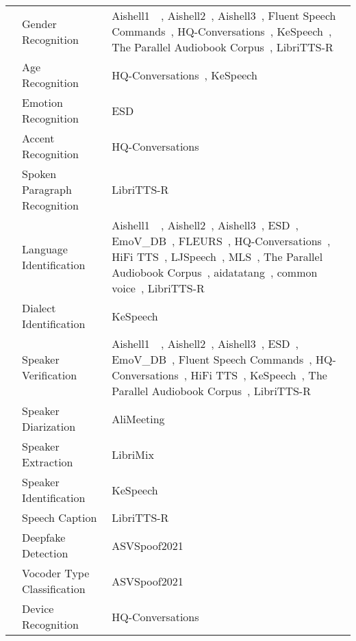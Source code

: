 \begin{longtable}{p{1cm}p{6cm}p{6cm}}
    & Gender Recognition & Aishell1~\citep{bu2017aishell}~\citep{bu2017aishell}, Aishell2~\citep{du2018aishell}, Aishell3~\citep{shi2020aishell}, Fluent Speech Commands~\citep{lugosch2019speech}, HQ-Conversations~\citep{xia2024iscslp}, KeSpeech~\citep{tang2021kespeech}, The Parallel Audiobook Corpus~\citep{pacorpus18}, LibriTTS-R~\citep{koizumi2023librittsr} \\
    \cline{2-3} %
    & Age Recognition & HQ-Conversations~\citep{xia2024iscslp}, KeSpeech~\citep{tang2021kespeech} \\
    \cline{2-3} %
    & Emotion Recognition & ESD~\citep{zhou2022emotional} \\
    \cline{2-3} %
    & Accent Recognition & HQ-Conversations~\citep{xia2024iscslp} \\
    \cline{2-3} %
    & Spoken Paragraph Recognition & LibriTTS-R~\citep{koizumi2023librittsr} \\
    \cline{2-3} %
    & Language Identification & Aishell1~\citep{bu2017aishell}~\citep{bu2017aishell}, Aishell2~\citep{du2018aishell}, Aishell3~\citep{shi2020aishell}, ESD~\citep{zhou2022emotional}, EmoV\_DB~\citep{adigwe2018emotional}, FLEURS~\citep{conneau2023fleurs}, HQ-Conversations~\citep{xia2024iscslp}, HiFi TTS~\citep{bakhturina2021hi}, LJSpeech~\citep{ljspeech17}, MLS~\citep{Pratap2020MLSAL}, The Parallel Audiobook Corpus~\citep{pacorpus18}, aidatatang~\citep{aidatatang200zh}, common voice~\citep{ardila2019common}, LibriTTS-R~\citep{koizumi2023librittsr} \\
    \cline{2-3} %
    & Dialect Identification & KeSpeech~\citep{tang2021kespeech} \\
    \cline{2-3} %
    & Speaker Verification & Aishell1~\citep{bu2017aishell}~\citep{bu2017aishell}, Aishell2~\citep{du2018aishell}, Aishell3~\citep{shi2020aishell}, ESD~\citep{zhou2022emotional}, EmoV\_DB~\citep{adigwe2018emotional}, Fluent Speech Commands~\citep{lugosch2019speech}, HQ-Conversations~\citep{xia2024iscslp}, HiFi TTS~\citep{bakhturina2021hi}, KeSpeech~\citep{tang2021kespeech}, The Parallel Audiobook Corpus~\citep{pacorpus18}, LibriTTS-R~\citep{koizumi2023librittsr} \\
    \cline{2-3} %
    & Speaker Diarization & AliMeeting~\citep{Yu2022M2MeT} \\
    \cline{2-3} %
    & Speaker Extraction & LibriMix~\citep{cosentino2020librimix}\\
    \cline{2-3} %
    & Speaker Identification & KeSpeech~\citep{tang2021kespeech} \\
    \cline{2-3} %
    & Speech Caption & LibriTTS-R~\citep{koizumi2023librittsr} \\
    \cline{2-3} %
    & Deepfake Detection & ASVSpoof2021~\citep{liu2023asvspoof} \\
    \cline{2-3} %
    & Vocoder Type Classification & ASVSpoof2021~\citep{liu2023asvspoof} \\  \cline{2-3} %
    & Device Recognition &  HQ-Conversations~\citep{xia2024iscslp} \\  \cline{2-3} %
    


\end{longtable}

